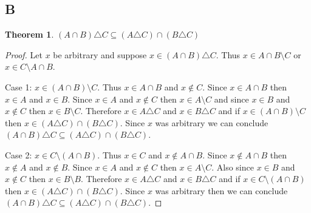 \documentclass{article}
\newtheorem*{theorem}{Theorem}  %
\begin{document}
\subsection*{B}
\begin{theorem} $(A \cap B) \triangle C \subseteq (A \triangle C) \cap (B \triangle C)$
\end{theorem}

\begin{proof}
Let $x$ be arbitrary and suppose $x \in (A \cap B) \triangle C$. Thus $x \in A \cap B \setminus C$ or $x \in C \setminus A \cap B$.

Case 1: $x \in (A \cap B) \setminus C$. Thus $x \in A \cap B$ and $x \notin C$. Since $x \in A \cap B$ then $x \in A$ and $x \in B$. Since $x \in A$ and $x \notin C$ then $x \in A \setminus C$ and since $x \in B$ and $x \notin C$ then $x \in B \setminus C$. Therefore $x \in A \triangle C$ and $x \in B \triangle C$ and if $x \in (A \cap B) \setminus C$ then $x \in (A \triangle C) \cap (B \triangle C)$. Since $x$ was arbitrary we can conclude $(A \cap B) \triangle C \subseteq (A \triangle C) \cap (B \triangle C)$.

Case 2: $x \in C \setminus (A \cap B)$. Thus $x \in C$ and $x \notin A \cap B$. Since $x \notin A \cap B$ then $x \notin A$ and $x \notin B$. Since $x \in A$ and $x \notin C$ then $x \in A \setminus C$. Also since $x \in B$ and $x \notin C$ then $x \in B \setminus B$. Therefore $x \in A \triangle C$ and $x \in B \triangle C$ and if $x \in C \setminus (A \cap B)$ then $x \in (A \triangle C) \cap (B \triangle C)$. Since $x$ was arbitrary then we can conclude $(A \cap B) \triangle C \subseteq (A \triangle C) \cap (B \triangle C)$.
\end{proof}
\end{document}
